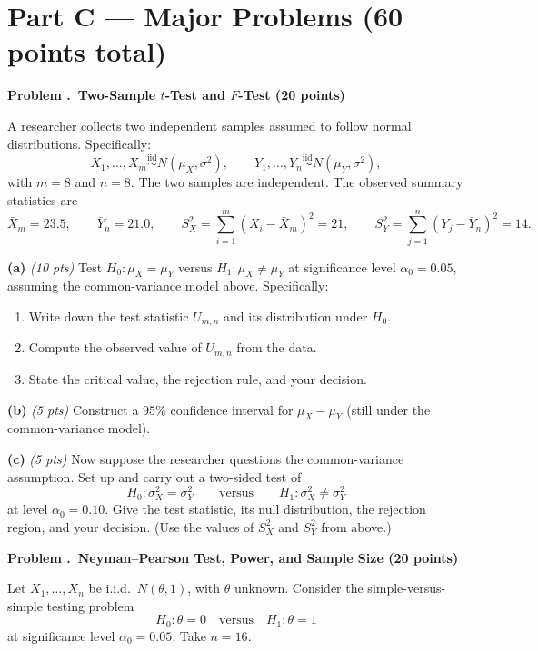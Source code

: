 \documentclass[11pt]{article}
\newcounter{probnum}
\newcommand{\prob}[2]{%
  \stepcounter{probnum}%
  \bigskip
  \noindent\textbf{Problem \theprobnum.\ #2 \hfill (#1 points)}\par\nobreak
}
\newcommand{\partlabel}[2]{\medskip\noindent\textbf{(#1)} \emph{(#2 pts)}\quad}
\begin{document}
\section*{Part C --- Major Problems \hfill (60 points total)}

\prob{20}{Two-Sample $t$-Test and $F$-Test}
A researcher collects two independent samples assumed to follow normal distributions. Specifically:
\[
X_1, \dots, X_m \overset{\text{iid}}{\sim} N(\mu_X, \sigma^2), \qquad Y_1, \dots, Y_n \overset{\text{iid}}{\sim} N(\mu_Y, \sigma^2),
\]
with $m = 8$ and $n = 8$. The two samples are independent. The observed summary statistics are
\[
\bar{X}_m = 23.5, \qquad \bar{Y}_n = 21.0, \qquad S_X^2 = \sum_{i=1}^m (X_i - \bar{X}_m)^2 = 21, \qquad S_Y^2 = \sum_{j=1}^n (Y_j - \bar{Y}_n)^2 = 14.
\]

\partlabel{a}{10}
Test $H_0: \mu_X = \mu_Y$ versus $H_1: \mu_X \neq \mu_Y$ at significance level $\alpha_0 = 0.05$, assuming the common-variance model above. Specifically:
\begin{enumerate}[label=(\roman*),leftmargin=*]
  \item Write down the test statistic $U_{m,n}$ and its distribution under $H_0$.
  \item Compute the observed value of $U_{m,n}$ from the data.
  \item State the critical value, the rejection rule, and your decision.
\end{enumerate}

\vspace{4cm}

\partlabel{b}{5}
Construct a $95\%$ confidence interval for $\mu_X - \mu_Y$ (still under the common-variance model).

\vspace{3cm}

\partlabel{c}{5}
Now suppose the researcher questions the common-variance assumption. Set up and carry out a two-sided test of
\[
H_0: \sigma_X^2 = \sigma_Y^2 \qquad \text{versus} \qquad H_1: \sigma_X^2 \neq \sigma_Y^2
\]
at level $\alpha_0 = 0.10$. Give the test statistic, its null distribution, the rejection region, and your decision. (Use the values of $S_X^2$ and $S_Y^2$ from above.)

\vfill
\newpage

\prob{20}{Neyman--Pearson Test, Power, and Sample Size}
Let $X_1, \dots, X_n$ be i.i.d.\ $N(\theta, 1)$, with $\theta$ unknown. Consider the simple-versus-simple testing problem
\[
H_0: \theta = 0 \quad \text{versus} \quad H_1: \theta = 1
\]
at significance level $\alpha_0 = 0.05$. Take $n = 16$.
\end{document}

